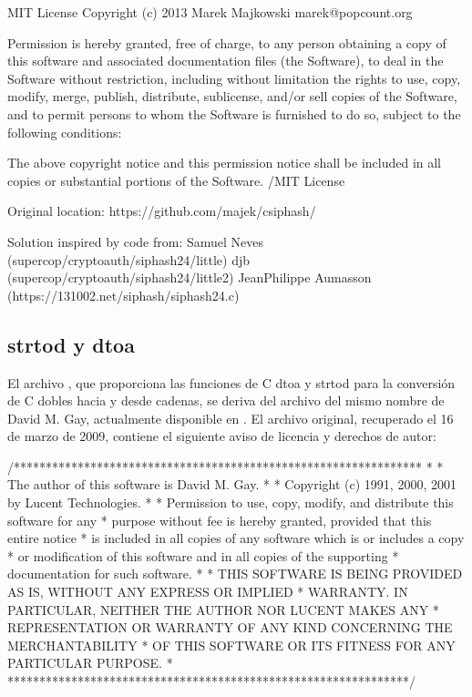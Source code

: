 \documentclass[a4,10pt,spanish]{sphinxmanual}
\begin{document}
\begin{sphinxVerbatim}[commandchars=\\\{\}]
\PYGZlt{}MIT License\PYGZgt{}
Copyright (c) 2013  Marek Majkowski \PYGZlt{}marek@popcount.org\PYGZgt{}

Permission is hereby granted, free of charge, to any person obtaining a copy
of this software and associated documentation files (the \PYGZdq{}Software\PYGZdq{}), to deal
in the Software without restriction, including without limitation the rights
to use, copy, modify, merge, publish, distribute, sublicense, and/or sell
copies of the Software, and to permit persons to whom the Software is
furnished to do so, subject to the following conditions:

The above copyright notice and this permission notice shall be included in
all copies or substantial portions of the Software.
\PYGZlt{}/MIT License\PYGZgt{}

Original location:
   https://github.com/majek/csiphash/

Solution inspired by code from:
   Samuel Neves (supercop/crypto\PYGZus{}auth/siphash24/little)
   djb (supercop/crypto\PYGZus{}auth/siphash24/little2)
   Jean\PYGZhy{}Philippe Aumasson (https://131002.net/siphash/siphash24.c)
\end{sphinxVerbatim}


\subsection{strtod y dtoa}
\label{\detokenize{license:strtod-and-dtoa}}
\sphinxAtStartPar
El archivo , que proporciona las funciones de C dtoa y strtod para la conversión de C dobles hacia y desde cadenas, se deriva del archivo del mismo nombre de David M. Gay, actualmente disponible en . El archivo original, recuperado el 16 de marzo de 2009, contiene el siguiente aviso de licencia y derechos de autor:

\begin{sphinxVerbatim}[commandchars=\\\{\}]
/****************************************************************
 *
 * The author of this software is David M. Gay.
 *
 * Copyright (c) 1991, 2000, 2001 by Lucent Technologies.
 *
 * Permission to use, copy, modify, and distribute this software for any
 * purpose without fee is hereby granted, provided that this entire notice
 * is included in all copies of any software which is or includes a copy
 * or modification of this software and in all copies of the supporting
 * documentation for such software.
 *
 * THIS SOFTWARE IS BEING PROVIDED \PYGZdq{}AS IS\PYGZdq{}, WITHOUT ANY EXPRESS OR IMPLIED
 * WARRANTY.  IN PARTICULAR, NEITHER THE AUTHOR NOR LUCENT MAKES ANY
 * REPRESENTATION OR WARRANTY OF ANY KIND CONCERNING THE MERCHANTABILITY
 * OF THIS SOFTWARE OR ITS FITNESS FOR ANY PARTICULAR PURPOSE.
 *
 ***************************************************************/
\end{sphinxVerbatim}
\end{document}
